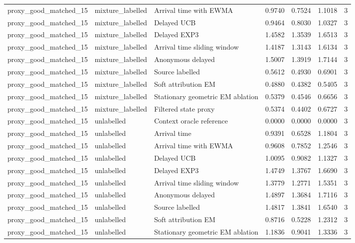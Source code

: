 \begin{tabular}{llllllr}
proxy\_good\_matched\_15 & mixture\_labelled & Arrival time with EWMA & 0.9740 & 0.7524 & 1.1018 & 3 \\
proxy\_good\_matched\_15 & mixture\_labelled & Delayed UCB & 0.9464 & 0.8030 & 1.0327 & 3 \\
proxy\_good\_matched\_15 & mixture\_labelled & Delayed EXP3 & 1.4582 & 1.3539 & 1.6513 & 3 \\
proxy\_good\_matched\_15 & mixture\_labelled & Arrival time sliding window & 1.4187 & 1.3143 & 1.6134 & 3 \\
proxy\_good\_matched\_15 & mixture\_labelled & Anonymous delayed & 1.5007 & 1.3919 & 1.7144 & 3 \\
proxy\_good\_matched\_15 & mixture\_labelled & Source labelled & 0.5612 & 0.4930 & 0.6901 & 3 \\
proxy\_good\_matched\_15 & mixture\_labelled & Soft attribution EM & 0.4880 & 0.4382 & 0.5405 & 3 \\
proxy\_good\_matched\_15 & mixture\_labelled & Stationary geometric EM ablation & 0.5379 & 0.4546 & 0.6656 & 3 \\
proxy\_good\_matched\_15 & mixture\_labelled & Filtered state proxy & 0.5374 & 0.4402 & 0.6727 & 3 \\
proxy\_good\_matched\_15 & unlabelled & Context oracle reference & 0.0000 & 0.0000 & 0.0000 & 3 \\
proxy\_good\_matched\_15 & unlabelled & Arrival time & 0.9391 & 0.6528 & 1.1804 & 3 \\
proxy\_good\_matched\_15 & unlabelled & Arrival time with EWMA & 0.9608 & 0.7852 & 1.2546 & 3 \\
proxy\_good\_matched\_15 & unlabelled & Delayed UCB & 1.0095 & 0.9082 & 1.1327 & 3 \\
proxy\_good\_matched\_15 & unlabelled & Delayed EXP3 & 1.4749 & 1.3767 & 1.6690 & 3 \\
proxy\_good\_matched\_15 & unlabelled & Arrival time sliding window & 1.3779 & 1.2771 & 1.5351 & 3 \\
proxy\_good\_matched\_15 & unlabelled & Anonymous delayed & 1.4897 & 1.3684 & 1.7116 & 3 \\
proxy\_good\_matched\_15 & unlabelled & Source labelled & 1.4817 & 1.3841 & 1.6540 & 3 \\
proxy\_good\_matched\_15 & unlabelled & Soft attribution EM & 0.8716 & 0.5228 & 1.2312 & 3 \\
proxy\_good\_matched\_15 & unlabelled & Stationary geometric EM ablation & 1.1836 & 0.9041 & 1.3336 & 3 \\

\end{tabular}
